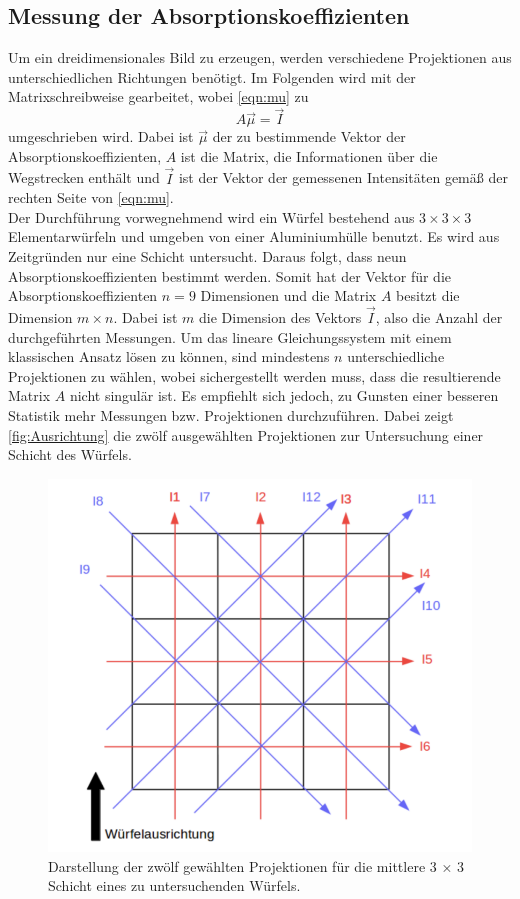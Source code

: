 \subsection{Messung der Absorptionskoeffizienten}
\label{subsec:Absorptionskoeffizient}
Um ein dreidimensionales Bild zu erzeugen, werden verschiedene Projektionen aus unterschiedlichen Richtungen benötigt.
Im Folgenden wird mit der Matrixschreibweise gearbeitet, wobei
\autoref{eqn:mu} zu
\begin{equation}
    A \vec{\mu} = \vec{I}
    \label{eqn:muMatrix}
\end{equation}
umgeschrieben wird. Dabei ist $\vec{\mu}$ der zu bestimmende Vektor der Absorptionskoeffizienten, $A$ ist die Matrix, die Informationen über die
Wegstrecken enthält und $\vec{I}$ ist der Vektor der gemessenen Intensitäten gemäß der rechten Seite von \autoref{eqn:mu}.\\
Der Durchführung vorwegnehmend wird ein Würfel bestehend aus $3 \times 3 \times 3$ Elementarwürfeln und umgeben von einer Aluminiumhülle benutzt.
Es wird aus Zeitgründen nur eine Schicht untersucht. Daraus folgt, dass neun Absorptionskoeffizienten bestimmt werden.
Somit hat der Vektor für die Absorptionskoeffizienten $n = 9$ Dimensionen und die Matrix $A$ besitzt die 
Dimension $m \times n$. Dabei ist $m$ die Dimension des Vektors $\vec{I}$, also die Anzahl der durchgeführten Messungen.
Um das lineare Gleichungssystem mit einem klassischen Ansatz lösen zu können, sind mindestens $n$ unterschiedliche Projektionen zu wählen,
wobei sichergestellt werden muss, dass die resultierende Matrix $A$ nicht singulär ist. 
Es empfiehlt sich jedoch, zu Gunsten einer besseren Statistik mehr Messungen bzw. Projektionen durchzuführen.
Dabei zeigt \autoref{fig:Ausrichtung} die zwölf ausgewählten Projektionen zur Untersuchung einer Schicht des Würfels.

\begin{figure}[H]
    \centering
    \includegraphics[scale=0.7]{Abbildungen/Ausrichtung.png}
    \caption{Darstellung der zwölf gewählten Projektionen für die mittlere 3 × 3 Schicht eines zu untersuchenden Würfels.\cite{V14}}
    \label{fig:Ausrichtung}
\end{figure}

